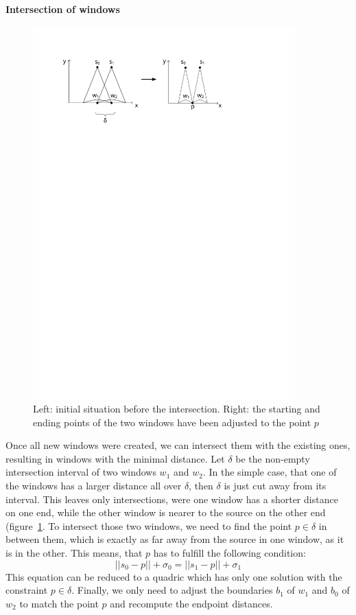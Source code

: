 \paragraph{Intersection of windows}
\begin{figure}[h]
	\centering
	\includegraphics[width = 0.9\textwidth]{pictures/geodesics_intersection}
	\caption{Left: initial situation before the intersection. Right: the starting and ending points of the two windows have been adjusted to the point $p$}
	\label{fig:geo_intersect}
\end{figure}
Once all new windows were created, we can intersect them with the existing ones, resulting in windows with the minimal distance.
Let $\delta$ be the non-empty intersection interval of two windows $w_1$ and $w_2$.
In the simple case, that one of the windows has a larger distance all over $\delta$, then $\delta$ is just cut away from its interval.
This leaves only intersections, were one window has a shorter distance on one end, while the other window is nearer to the source on the other end (figure~\ref{fig:geo_intersect}.
To intersect those two windows, we need to find the point $p \in \delta$  in between them, which is exactly as far away from the source in one window, as it is in the other.
This means, that $p$ has to fulfill the following condition:
$$||s_0 - p|| + \sigma_0 = ||s_1 - p|| + \sigma_1$$
This equation can be reduced to a quadric which has only one solution with the constraint $p \in \delta$.
Finally, we only need to adjust the boundaries $b_1$ of $w_1$ and $b_0$ of $w_2$ to match the point $p$ and recompute the endpoint distances.

